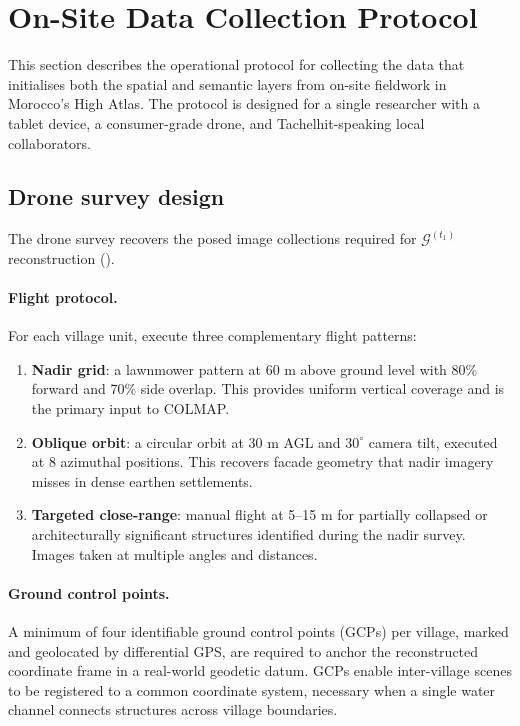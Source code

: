 \documentclass[11pt,a4paper]{article}
\theoremstyle{plain}
\theoremstyle{definition}
\theoremstyle{remark}
\newcommand{\GS}{\mathcal{G}}
\begin{document}
\section{On-Site Data Collection Protocol}
\label{sec:fieldwork}

This section describes the operational protocol for collecting the data
that initialises both the spatial and semantic layers from on-site
fieldwork in Morocco's High Atlas. The protocol is designed for a
single researcher with a tablet device, a consumer-grade drone, and
Tachelhit-speaking local collaborators.

\subsection{Drone survey design}
\label{sec:fieldwork_drone}

The drone survey recovers the posed image collections required for
$\GS^{(t_1)}$ reconstruction ().

\paragraph{Flight protocol.}
For each village unit, execute three complementary flight patterns:
\begin{enumerate}[leftmargin=2em]
  \item \textbf{Nadir grid}: a lawnmower pattern at 60 m above ground
    level with 80\% forward and 70\% side overlap. This provides
    uniform vertical coverage and is the primary input to COLMAP.
  \item \textbf{Oblique orbit}: a circular orbit at 30 m AGL and
    $30^\circ$ camera tilt, executed at 8 azimuthal positions. This
    recovers facade geometry that nadir imagery misses in dense
    earthen settlements.
  \item \textbf{Targeted close-range}: manual flight at 5--15 m for
    partially collapsed or architecturally significant structures
    identified during the nadir survey. Images taken at multiple
    angles and distances.
\end{enumerate}

\paragraph{Ground control points.}
A minimum of four identifiable ground control points (GCPs) per
village, marked and geolocated by differential GPS, are required to
anchor the reconstructed coordinate frame in a real-world geodetic
datum. GCPs enable inter-village scenes to be registered to a common
coordinate system, necessary when a single water channel connects
structures across village boundaries.
\end{document}
